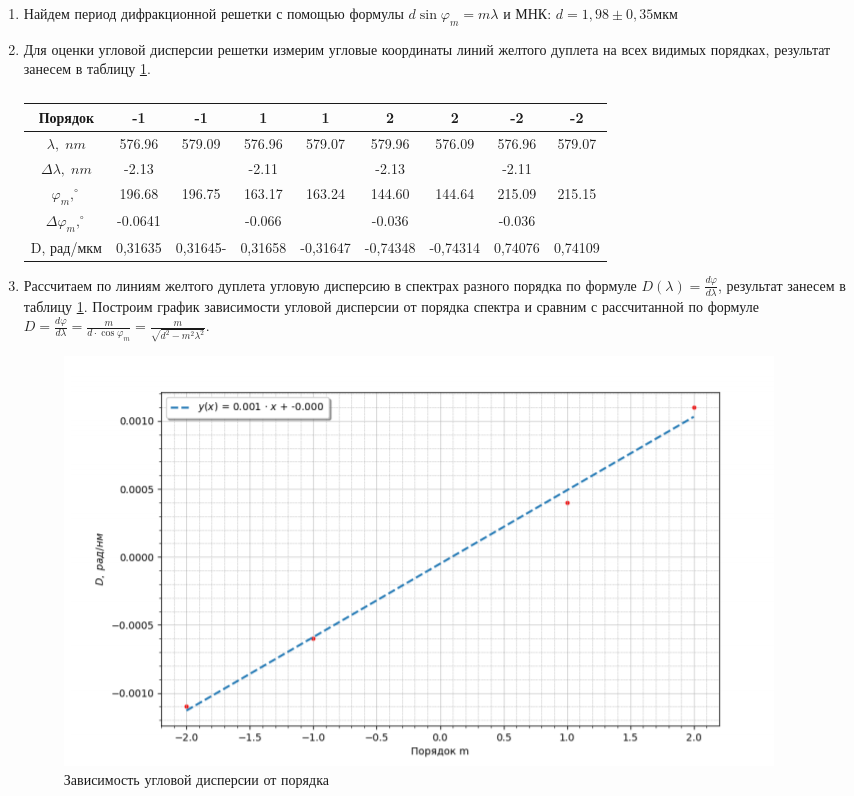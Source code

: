 \documentclass[a4paper,12pt]{article}
\theoremstyle{plain} %
\theoremstyle{definition} %
\theoremstyle{remark} %
\begin{document}
\begin{enumerate}
	\item Найдем период дифракционной решетки с помощью формулы $d \sin{\varphi_m} = m\lambda$ и МНК:
	$d= 1,98 \pm 0,35 \text{мкм}$
	\item Для оценки угловой дисперсии решетки измерим угловые координаты линий желтого дуплета на всех видимых порядках, результат занесем в таблицу \ref{t2}.
	
	\begin{table}[h!]
		\begin{center}
			\begin{tabular}{|c|c|c|c|c|c|c|c|c|}
				\hline
				Порядок&-1&-1&1&1&2&2&-2&-2 \\ \hline 
				$\lambda, \;nm$&576.96&579.09&576.96&579.07&579.96&576.09&576.96&579.07 \\ \hline
				$\Delta \lambda, \; nm$& -2.13&&-2.11&&-2.13&&-2.11& \\ \hline
				$\varphi_m,^{\circ}$& 196.68& 196.75 &163.17 & 163.24& 144.60& 144.64& 215.09& 215.15 \\ \hline 
				$\Delta \varphi_m,^{\circ}$& -0.0641&& -0.066 && -0.036 && -0.036 & \\ \hline 
				D, рад/мкм& 0,31635&0,31645-&0,31658&-0,31647&-0,74348&-0,74314&0,74076&0,74109 \\ \hline
			\end{tabular}
			\caption{}
			\label{t2}
		\end{center}
	\end{table}
	
	\item Рассчитаем по линиям желтого дуплета угловую дисперсию в спектрах разного порядка по формуле $D(\lambda) = \frac{d \varphi}{d \lambda}$, результат занесем в таблицу \ref{t2}.
	Построим график зависимости угловой дисперсии от порядка спектра и сравним с рассчитанной по формуле $D = \frac{d \varphi}{d \lambda} = \frac{m}{d \cdot \cos{\varphi_m}} = \frac{m}{\sqrt{d^2 - m^2 \lambda^2}}$.
	
	\begin{figure}[h!]
		\begin{center}
			\includegraphics[scale = 1]{5.png}
			\caption{Зависимость угловой дисперсии от порядка}
			\label{p1}
		\end{center}
	\end{figure}
	

\end{enumerate}
\end{document}
